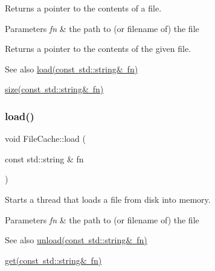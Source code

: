 Returns a pointer to the contents of a file. 


\begin{DoxyParams}{Parameters}
{\em fn} & the path to (or filename of) the file \\
\hline
\end{DoxyParams}
\begin{DoxyReturn}{Returns}
a pointer to the contents of the given file. 
\end{DoxyReturn}
\begin{DoxySeeAlso}{See also}
\mbox{\hyperlink{classsage_1_1FileCache_addb15593e848f038a5d7a7c6c3828053}{load(const std\+::string\& fn)}} 

\mbox{\hyperlink{classsage_1_1FileCache_a369b86f1fb585e5ce5142a7f1f22e38c}{size(const std\+::string\& fn)}} 
\end{DoxySeeAlso}
\mbox{\label{classsage_1_1FileCache_addb15593e848f038a5d7a7c6c3828053}} 
\subsubsection{\texorpdfstring{load()}{load()}}
{\footnotesize\ttfamily void File\+Cache\+::load (\begin{DoxyParamCaption}\item[{const std\+::string \&}]{fn }\end{DoxyParamCaption})}



Starts a thread that loads a file from disk into memory. 


\begin{DoxyParams}{Parameters}
{\em fn} & the path to (or filename of) the file \\
\hline
\end{DoxyParams}
\begin{DoxySeeAlso}{See also}
\mbox{\hyperlink{classsage_1_1FileCache_a902a36451f11c4b6e4267358bfadb024}{unload(const std\+::string\& fn)}} 

\mbox{\hyperlink{classsage_1_1FileCache_a67fe1af6ccb8d06b7e97dc54a1836eee}{get(const std\+::string\& fn)}} 
\end{DoxySeeAlso}
\mbox{\label{classsage_1_1FileCache_a991e5569482a4f6f864dd9854c4524d0}} 

